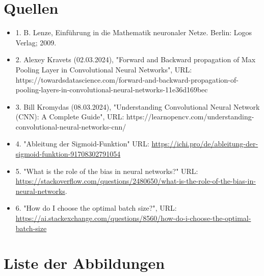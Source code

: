 \documentclass[12pt]{article}
\begin{document}
\section{Quellen}
\begin{itemize}
\item 1. B. Lenze, Einführung in die Mathematik neuronaler Netze. Berlin: Logos Verlag; 2009.
\item 2. Alexey Kravets (02.03.2024), "Forward and Backward propagation of Max Pooling Layer in Convolutional Neural Networks", URL: https://towardsdatascience.com/forward-and-backward-propagation-of-pooling-layers-in-convolutional-neural-networks-11e36d169bec
\item 3. Bill Kromydas (08.03.2024), "Understanding Convolutional Neural Network (CNN): A Complete Guide", URL: https://learnopencv.com/understanding-convolutional-neural-networks-cnn/



\item 4. "Ableitung der Sigmoid-Funktion" URL: \url{https://ichi.pro/de/ableitung-der-sigmoid-funktion-91708302791054}
\item 5. "What is the role of the bias in neural networks?" URL: \url{https://stackoverflow.com/questions/2480650/what-is-the-role-of-the-bias-in-neural-networks}.
\item 6. "How do I choose the optimal batch size?", URL: \url{https://ai.stackexchange.com/questions/8560/how-do-i-choose-the-optimal-batch-size}
\end{itemize}

\cleardoublepage
\section{Liste der Abbildungen}
\listoffigures
\end{document}
